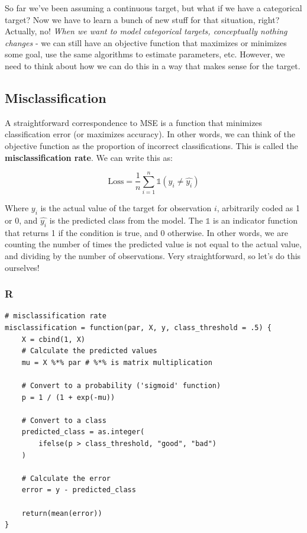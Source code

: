 \documentclass[
  letterpaper,
]{krantz}
\begin{document}
So far we've been assuming a continuous target, but what if we have a
categorical target? Now we have to learn a bunch of new stuff for that
situation, right? Actually, no! \emph{When we want to model categorical
targets, conceptually nothing changes} - we can still have an objective
function that maximizes or minimizes some goal, use the same algorithms
to estimate parameters, etc. However, we need to think about how we can
do this in a way that makes sense for the target.

\subsection{Misclassification}\label{sec-estim-misclass}

A straightforward correspondence to MSE is a function that minimizes
classification error (or maximizes accuracy). In other words, we can
think of the objective function as the proportion of incorrect
classifications. This is called the \textbf{misclassification rate}. We
can write this as:

\[
\textrm{Loss} = \frac{1}{n} \sum_{i=1}^{n} \mathbb{1}(y_i \neq \hat{y_i})
\]

Where \(y_i\) is the actual value of the target for observation \(i\),
arbitrarily coded as 1 or 0, and \(\hat{y_i}\) is the predicted class
from the model. The \(\mathbb{1}\) is an indicator function that returns
1 if the condition is true, and 0 otherwise. In other words, we are
counting the number of times the predicted value is not equal to the
actual value, and dividing by the number of observations. Very
straightforward, so let's do this ourselves!

\subsubsection{R}

\begin{verbatim}
# misclassification rate
misclassification = function(par, X, y, class_threshold = .5) {
    X = cbind(1, X)
    # Calculate the predicted values
    mu = X %*% par # %*% is matrix multiplication

    # Convert to a probability ('sigmoid' function)
    p = 1 / (1 + exp(-mu))

    # Convert to a class
    predicted_class = as.integer(
        ifelse(p > class_threshold, "good", "bad")
    )

    # Calculate the error
    error = y - predicted_class

    return(mean(error))
}
\end{verbatim}
\end{document}
